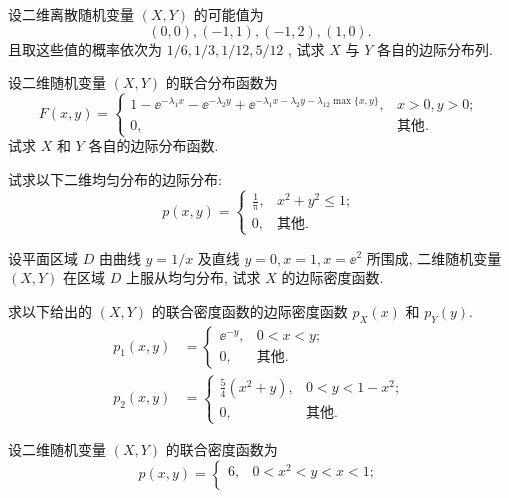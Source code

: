   \begin{xiti}
   		\item 设二维离散随机变量 $(X,Y)$ 的可能值为
   		\begin{equation*}
   			(0,0), (-1,1), (-1,2), (1,0).
   		\end{equation*}
   		且取这些值的概率依次为 $1/6,1/3,1/12,5/12$ , 试求 $X$ 与 $Y$ 各自的边际分布列.
   		\item 设二维随机变量 $(X,Y)$ 的联合分布函数为
   		\begin{equation*}
   			F(x,y)=\begin{cases}
   			1-\ee^{-\lambda_{1}x}-\ee^{-\lambda_{2}y}+\ee^{-\lambda_{1}x-\lambda_{2}y-\lambda_{12}\max\{x,y\}}, & x>0,y>0;\\
   			0, & \text{其他}.
   			\end{cases}
   		\end{equation*}
   		试求 $X$ 和 $Y$ 各自的边际分布函数.
   		\item 试求以下二维均匀分布的边际分布:
   		\begin{equation*}
   			p(x,y)=\begin{cases}
   			\frac{1}{\uppi}, & x^2+y^2\leqslant1;\\
   			0, & \text{其他}.
   			\end{cases}
   		\end{equation*}
   		\item 设平面区域 $D$ 由曲线 $y=1/x$ 及直线 $y=0,x=1,x=\ee^2$ 所围成, 二维随机变量 $(X,Y)$ 在区域 $D$ 上服从均匀分布, 试求 $X$ 的边际密度函数.
   		\item 求以下给出的 $(X,Y)$ 的联合密度函数的边际密度函数 $p_{X}(x)$ 和 $p_{Y}(y)$.
   		\begin{align*}
   			p_{1}(x,y) &= \begin{cases}
   			\ee^{-y}, & 0<x<y;\\
   			0, & \text{其他}.
   			\end{cases}\\
   			p_{2}(x,y) &= \begin{cases}
   			\frac{5}{4}(x^2+y), & 0<y<1-x^2;\\
   			0, & \text{其他}.
   			\end{cases}
   		\end{align*}
   		\item 设二维随机变量 $(X,Y)$ 的联合密度函数为
   		\begin{equation*}
   			p(x,y)=\begin{cases}
   			6, & 0<x^2<y<x<1;\\

\end{cases}
\end{equation*}
\end{xiti}
